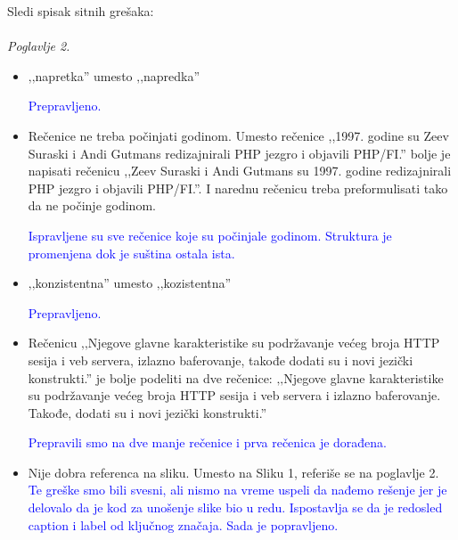 \documentclass[a4paper]{report}
\newcommand{\odgovor}[1]{\textcolor{blue}{#1}}
\begin{document}
Sledi spisak sitnih grešaka:\\\\

\textit{Poglavlje 2.}
\begin{itemize}
\item ‚‚napretka'' umesto ‚‚napredka''

\odgovor{Prepravljeno.}

\item Rečenice ne treba počinjati godinom. Umesto rečenice ,,1997. godine su Zeev Suraski i Andi Gutmans redizajnirali PHP jezgro i objavili PHP/FI.'' bolje je napisati rečenicu ,,Zeev Suraski i Andi Gutmans su 1997. godine redizajnirali PHP jezgro i objavili PHP/FI.''. I narednu rečenicu treba preformulisati tako da ne počinje godinom.

\odgovor{Ispravljene su sve rečenice koje su počinjale godinom. Struktura je promenjena dok je suština ostala ista.}

\item ‚‚konzistentna'' umesto ‚‚kozistentna''

\odgovor{Prepravljeno.}

\item Rečenicu ‚‚Njegove glavne karakteristike su podržavanje većeg broja HTTP sesija i veb servera, izlazno baferovanje, takođe dodati su i novi jezički konstrukti.'' je bolje podeliti na dve rečenice: ‚‚Njegove glavne karakteristike su podržavanje većeg broja HTTP sesija i veb servera i izlazno baferovanje. Takođe, dodati su i novi jezički konstrukti.''

\odgovor{Prepravili smo na dve manje rečenice i prva rečenica je dorađena.}

\item Nije dobra referenca na sliku. Umesto na Sliku 1, referiše se na poglavlje 2.\\
\odgovor{Te greške smo bili svesni, ali nismo na vreme uspeli da nađemo rešenje jer je delovalo da je kod za unošenje slike bio u redu. Ispostavlja se da je redosled caption i label od ključnog značaja. Sada je popravljeno.}
\end{itemize}
\end{document}
